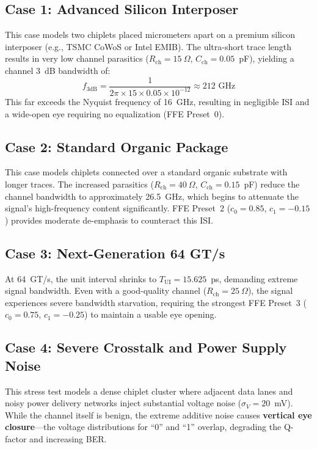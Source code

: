 \documentclass[conference]{IEEEtran}
\begin{document}
\subsection{Case 1: Advanced Silicon Interposer}

This case models two chiplets placed micrometers apart on a premium silicon interposer (e.g., TSMC CoWoS or Intel EMIB). The ultra-short trace length results in very low channel parasitics ($R_{\text{ch}} = 15~\Omega$, $C_{\text{ch}} = 0.05$~pF), yielding a channel 3~dB bandwidth of:
\begin{equation}
    f_{3\text{dB}} = \frac{1}{2\pi \times 15 \times 0.05 \times 10^{-12}} \approx 212 \text{ GHz}
\end{equation}
This far exceeds the Nyquist frequency of 16~GHz, resulting in negligible ISI and a wide-open eye requiring no equalization (FFE Preset~0).

\subsection{Case 2: Standard Organic Package}

This case models chiplets connected over a standard organic substrate with longer traces. The increased parasitics ($R_{\text{ch}} = 40~\Omega$, $C_{\text{ch}} = 0.15$~pF) reduce the channel bandwidth to approximately 26.5~GHz, which begins to attenuate the signal's high-frequency content significantly. FFE Preset~2 ($c_0 = 0.85$, $c_1 = -0.15$) provides moderate de-emphasis to counteract this ISI.

\subsection{Case 3: Next-Generation 64 GT/s}

At 64~GT/s, the unit interval shrinks to $T_{\text{UI}} = 15.625$~ps, demanding extreme signal bandwidth. Even with a good-quality channel ($R_{\text{ch}} = 25~\Omega$), the signal experiences severe bandwidth starvation, requiring the strongest FFE Preset~3 ($c_0 = 0.75$, $c_1 = -0.25$) to maintain a usable eye opening.

\subsection{Case 4: Severe Crosstalk and Power Supply Noise}

This stress test models a dense chiplet cluster where adjacent data lanes and noisy power delivery networks inject substantial voltage noise ($\sigma_V = 20$~mV). While the channel itself is benign, the extreme additive noise causes \textbf{vertical eye closure}---the voltage distributions for ``0'' and ``1'' overlap, degrading the Q-factor and increasing BER.
\end{document}
